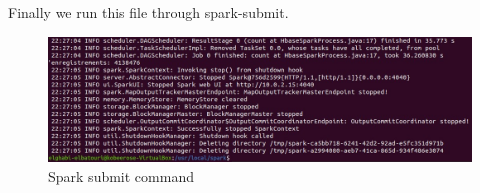\begin{spacing}{1.2}
\par Finally we run this file through spark-submit.
\\
\begin{figure}[!htb] 
\begin{center} 
\includegraphics[width=1\linewidth]{Pictures/HBase/Data processing with Spark/Installing and Configuring Spark-2.4.3/Spark submit command} 
\end{center} 
\caption{Spark submit command} 
\end{figure}  \FloatBarrier
\\

\end{spacing}